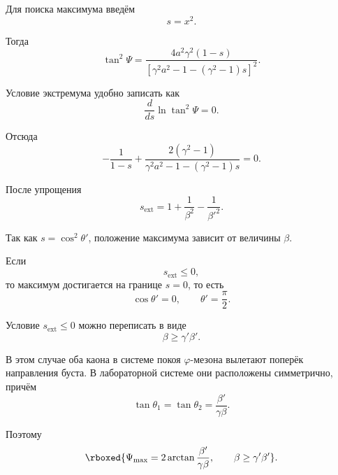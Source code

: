 \documentclass[../final.tex]{subfiles}
\begin{document}
Для поиска максимума введём
%
\begin{equation*}
    s=x^2.
\end{equation*}

Тогда
%
\begin{equation*}
    \tan^2\Psi
    =
    \frac{
        4a^2\gamma^2(1-s)
    }{
        \left[
            \gamma^2a^2
            -
            1
            -
            (\gamma^2-1)s
        \right]^2
    }.
\end{equation*}

Условие экстремума удобно записать как
%
\begin{equation*}
    \frac{d}{ds}
    \ln\tan^2\Psi
    =
    0.
\end{equation*}

Отсюда
%
\begin{equation*}
    -\frac{1}{1-s}
    +
    \frac{
        2(\gamma^2-1)
    }{
        \gamma^2a^2
        -
        1
        -
        (\gamma^2-1)s
    }
    =
    0.
\end{equation*}

После упрощения
%
\begin{equation*}
    s_{\mathrm{ext}}
    =
    1+\frac{1}{\beta^2}-\frac{1}{\beta'^2}.
\end{equation*}

Так как $s=\cos^2\theta'$, положение максимума зависит
от величины $\beta$.

Если
%
\begin{equation*}
    s_{\mathrm{ext}}\leq0,
\end{equation*}
%
то максимум достигается на границе $s=0$, то есть
%
\begin{equation*}
    \cos\theta'=0,
    \qquad
    \theta'=\frac{\pi}{2}.
\end{equation*}

Условие $s_{\mathrm{ext}}\leq0$ можно переписать в виде
%
\begin{equation*}
    \beta
    \geq
    \gamma'\beta'.
\end{equation*}

В этом случае оба каона в системе покоя $\varphi$-мезона
вылетают поперёк направления буста. В лабораторной системе
они расположены симметрично, причём
%
\begin{equation*}
    \tan\theta_1
    =
    \tan\theta_2
    =
    \frac{
        \beta'
    }{
        \gamma\beta
    }.
\end{equation*}

Поэтому
%
\begin{equation*}
    \rboxed{
        \Psi_{\max}
        =
        2\arctan
        \frac{
            \beta'
        }{
            \gamma\beta
        },
        \qquad
        \beta\geq\gamma'\beta'
    }.
\end{equation*}
\end{document}
